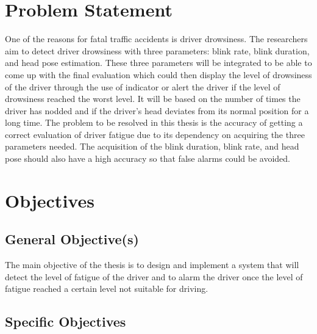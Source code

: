 \section{Problem Statement}


One of the reasons for fatal traffic accidents is driver drowsiness. The researchers aim to detect driver drowsiness with three parameters: blink rate, blink duration, and head pose estimation. These three parameters will be integrated to be able to come up with the final evaluation which could then display the level of drowsiness of the driver through the use of indicator or alert the driver if the level of drowsiness reached the worst level. It will be based on the number of times the driver has nodded and if the driver’s head deviates from its normal position for a long time. The problem to be resolved in this thesis is the accuracy of getting a correct evaluation of driver fatigue due to its dependency on acquiring the three parameters needed. The acquisition of the blink duration, blink rate, and head pose should also have a high accuracy so that false alarms could be avoided. 



\section{Objectives}


\subsection{General Objective(s)}
The main objective of the thesis is to design and implement a system that will detect the level of fatigue of the driver and to alarm the driver once the level of fatigue reached a certain level not suitable for driving.

\subsection{Specific Objectives}

